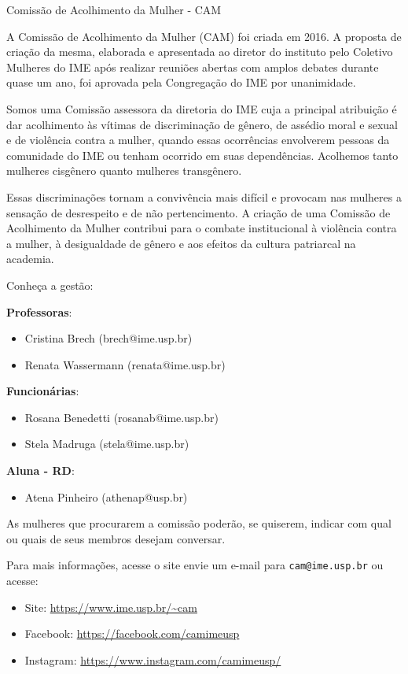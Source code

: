 \begin{subsecao}{Comissão de Acolhimento da Mulher - CAM}

A Comissão de Acolhimento da Mulher (CAM) foi criada em 2016. A proposta de 
criação da mesma, elaborada e apresentada ao diretor do instituto pelo 
Coletivo Mulheres do IME após realizar reuniões abertas com amplos debates 
durante quase um ano, foi aprovada pela Congregação do IME por unanimidade.

Somos uma Comissão assessora da diretoria do IME cuja a principal atribuição 
é dar acolhimento às vítimas de discriminação de gênero, de assédio moral e 
sexual e de violência contra a mulher, quando essas ocorrências envolverem 
pessoas da comunidade do IME ou tenham ocorrido em suas dependências. Acolhemos
tanto mulheres cisgênero quanto mulheres transgênero.

Essas discriminações tornam a convivência mais difícil e provocam nas mulheres
a sensação de desrespeito e de não pertencimento. A criação de uma Comissão de 
Acolhimento da Mulher contribui para o combate institucional à violência contra
a mulher, à desigualdade de gênero e aos efeitos da cultura patriarcal na academia.

Conheça a gestão: 

\textbf{Professoras}: 
\vspace{-15pt}
\begin{itemize}
  \item Cristina Brech (brech@ime.usp.br)
  \item Renata Wassermann (renata@ime.usp.br)
\end{itemize}

\textbf{Funcionárias}: 
\vspace{-15pt}
\begin{itemize}
  \item Rosana Benedetti (rosanab@ime.usp.br)
  \item Stela Madruga (stela@ime.usp.br)
\end{itemize}

\textbf{Aluna - RD}: 
\vspace{-15pt}
\begin{itemize}
  \item Atena Pinheiro (athenap@usp.br)
\end{itemize}

As mulheres que procurarem a comissão poderão, se quiserem, indicar com qual ou 
quais de seus membros desejam conversar.

Para mais informações, acesse o site envie um e-mail para {\tt cam@ime.usp.br} ou acesse:
\begin{itemize}
  \item Site: \url{https://www.ime.usp.br/~cam}
  \item Facebook: \url{https://facebook.com/camimeusp}
  \item Instagram: \url{https://www.instagram.com/camimeusp/}
\end{itemize}


\end{subsecao}
